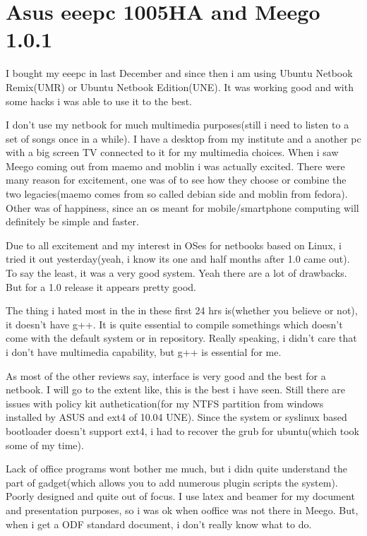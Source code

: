\section*{Asus eeepc 1005HA and Meego 1.0.1}
\vskip 2pt

I bought my eeepc in last December and since then i am using Ubuntu Netbook Remix(UMR) or Ubuntu Netbook Edition(UNE). It was working good and with some hacks i was able to use it to the best.

I don’t use my netbook for much multimedia purposes(still i need to listen to a set of songs once in a while). I have a desktop from my institute and a another pc with a big screen TV connected to it for my multimedia choices. When i saw Meego coming out from maemo and moblin i was actually excited. There were many reason for excitement, one was of to see how they choose or combine the two legacies(maemo comes from so called debian side and moblin from fedora). Other was of happiness, since an os meant for mobile/smartphone computing will definitely be simple and faster.

Due to all excitement and my interest in OSes for netbooks based on Linux, i tried it out yesterday(yeah, i know its one and half months after 1.0 came out). To say the least, it was a very good system. Yeah there are a lot of drawbacks. But for a 1.0 release it appears pretty good.

The thing i hated most in the in these first 24 hrs is(whether you believe or not), it doesn’t have g++. It is quite essential to compile somethings which doesn’t come with the default system or in repository. Really speaking, i didn’t care that i don’t have multimedia capability, but g++ is essential for me.

As most of the other reviews say, interface is very good and the best for a netbook. I will go to the extent like, this is the best i have seen. Still there are issues with policy kit authetication(for my NTFS partition from windows installed by ASUS and ext4 of 10.04 UNE). Since the system or syslinux based bootloader doesn’t support ext4, i had to recover the grub for ubuntu(which took some of my time).

Lack of office programs wont bother me much, but i didn quite understand the part of gadget(which allows you to add numerous plugin scripts the system). Poorly designed and quite out of focus. I use latex and beamer for my document and presentation purposes, so i was ok when ooffice was not there in Meego. But, when i get a ODF standard document, i don’t really know what to do.

